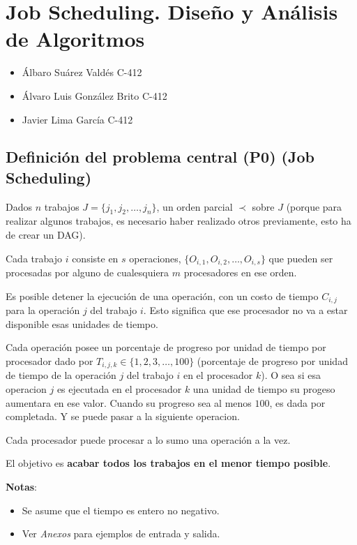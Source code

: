 \documentclass[14pt]{extarticle}
\begin{document}
\section*{Job Scheduling. Diseño y Análisis de Algoritmos}

\begin{itemize}
    \item Álbaro Suárez Valdés C-412
    \item Álvaro Luis González Brito C-412
    \item Javier Lima García C-412
\end{itemize}

\subsection*{Definición del problema central (P0) (Job Scheduling)}

Dados $n$ trabajos $J = \{j_1, j_2, \ldots, j_n\}$, un orden parcial $\prec$ sobre $J$ (porque para realizar algunos trabajos, es necesario haber realizado otros previamente, esto ha de crear un DAG). 

Cada trabajo $i$ consiste en $s$ operaciones, $\{O_{i,1}, O_{i,2}, \ldots, O_{i,s}\}$ que pueden ser procesadas por alguno de cualesquiera $m$ procesadores en ese orden. 

Es posible detener la ejecución de una operación, con un costo de tiempo $C_{i,j}$ para la operación $j$ del trabajo $i$. Esto significa que ese procesador no va a estar disponible esas unidades de tiempo.

Cada operación posee un porcentaje de progreso por unidad de tiempo por procesador dado por $T_{i, j, k} \in \{1, 2, 3, \ldots, 100\}$ (porcentaje de progreso por unidad de tiempo de la operación $j$ del trabajo $i$ en el procesador $k$). O sea si esa operacion $j$ es ejecutada en el procesador $k$ una unidad de tiempo su progeso aumentara en ese valor. Cuando su progreso sea al menos $100$, es dada por completada. Y se puede pasar a la siguiente operacion. 

Cada procesador puede procesar a lo sumo una operación a la vez. 

El objetivo es \textbf{acabar todos los trabajos en el menor tiempo posible}.

\textbf{Notas}:
\begin{itemize}
    \item Se asume que el tiempo es entero no negativo.
    \item Ver \textit{Anexos} para ejemplos de entrada y salida.
\end{itemize}
\end{document}
